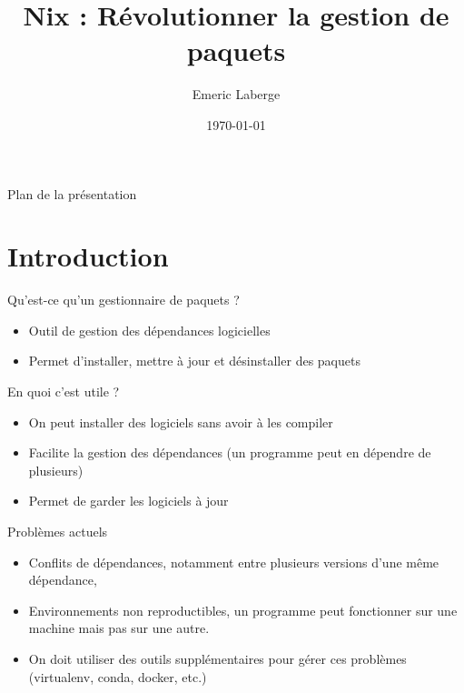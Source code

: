 \documentclass{beamer}
\title{Nix : Révolutionner la gestion de paquets}
\author{Emeric Laberge}
\date{\today}
\begin{document}
\maketitle

\begin{frame}{Plan de la présentation}
	\tableofcontents
\end{frame}

\section{Introduction}

\begin{frame}{Qu'est-ce qu'un gestionnaire de paquets ?}
  \begin{itemize}
    \item Outil de gestion des dépendances logicielles
    \item Permet d'installer, mettre à jour et désinstaller des paquets
  \end{itemize} 
\end{frame}

    \begin{frame}{En quoi c'est utile ?}
    \begin{itemize}
      \item On peut installer des logiciels sans avoir à les compiler 
      \item Facilite la gestion des dépendances (un programme peut en dépendre
        de plusieurs)
      \item Permet de garder les logiciels à jour
    \end{itemize}
  \end{frame}

\begin{frame}{Problèmes actuels}
  \begin{itemize}
    \item Conflits de dépendances, notamment entre plusieurs versions d'une même
      dépendance, 
    \item Environnements non reproductibles, un programme peut fonctionner sur
      une machine mais pas sur une autre. 
    \item On doit utiliser des outils supplémentaires pour gérer ces problèmes
      (virtualenv, conda, docker, etc.)
  \end{itemize}
\end{frame}
\end{document}
